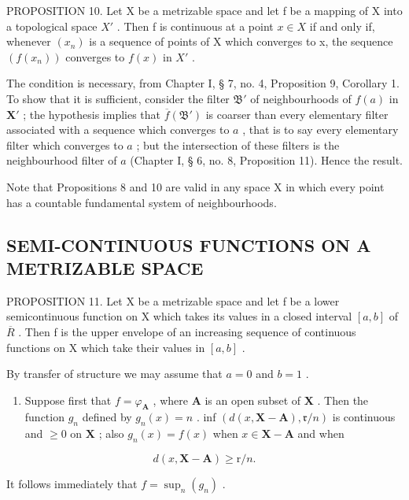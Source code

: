 PROPOSITION 10. Let X be a metrizable space and let f be a mapping of X into a topological space \(X'\) . Then f is continuous at a point \(x \in X\) if and only if, whenever \((x_n)\) is a sequence of points of X which converges to x, the sequence \((f(x_n))\) converges to \(f(x)\) in \(X'\) .

The condition is necessary, from Chapter I, § 7, no. 4, Proposition 9, Corollary 1. To show that it is sufficient, consider the filter \(\mathfrak{B}'\) of neighbourhoods of \(f(a)\) in \(\mathbf{X}'\) ; the hypothesis implies that \(\overline{f}(\mathfrak{B}')\) is coarser than every elementary filter associated with a sequence which converges to \(a\) , that is to say every elementary filter which converges to \(a\) ; but the intersection of these filters is the neighbourhood filter of \(a\) (Chapter I, § 6, no. 8, Proposition 11). Hence the result.

Note that Propositions 8 and 10 are valid in any space X in which every point has a countable fundamental system of neighbourhoods.

\subsection{SEMI-CONTINUOUS FUNCTIONS ON A METRIZABLE SPACE}

PROPOSITION 11. Let X be a metrizable space and let f be a lower semicontinuous function on X which takes its values in a closed interval \([a, b]\) of \(\overline{R}\) . Then f is the upper envelope of an increasing sequence of continuous functions on X which take their values in \([a, b]\) .

By transfer of structure we may assume that \(a = 0\) and \(b = 1\) .

\begin{enumerate}
\def\labelenumi{(\roman{enumi})}
\tightlist
\item
  Suppose first that \(f = \varphi_{\mathbf{A}}\) , where \(\mathbf{A}\) is an open subset of \(\mathbf{X}\) . Then the function \(g_n\) defined by \(g_n(x) = n\) . inf \((d(x, \mathbf{X} - \mathbf{A}), \mathfrak{r}/n)\) is continuous and \(\geqslant 0\) on \(\mathbf{X}\) ; also \(g_n(x) = f(x)\) when \(x \in \mathbf{X} - \mathbf{A}\) and when
\end{enumerate}

\[
d (x, \mathbf {X} - \mathbf {A}) \geqslant \mathrm{r} / n.
\]

It follows immediately that \(f = \sup_{n}(g_n)\) .

